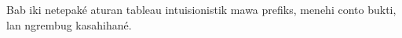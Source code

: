 \documentclass[../../../include/open-logic-chapter]{subfiles}
\begin{document}

\begin{editorial}
Bab iki netepaké aturan tableau intuisionistik mawa prefiks, menehi conto bukti, lan ngrembug kasahihané.
\end{editorial}


\OLEndChapterHook
\end{document}
